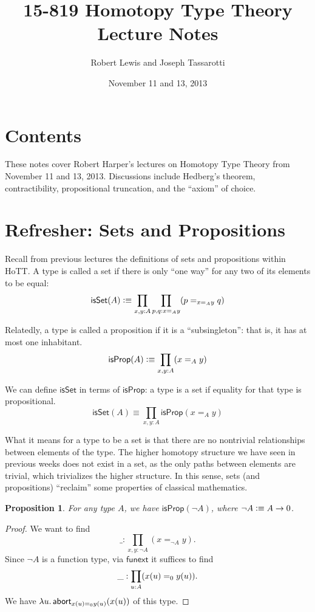 \documentclass[11pt]{article}
\title{15-819 Homotopy Type Theory\\Lecture Notes}
\author{Robert Lewis and Joseph Tassarotti}
\date{November 11 and 13, 2013}
\newcommand*{\funext}{\mathsf{funext}}
\newcommand*{\isSet}{\mathsf{isSet}}
\newcommand*{\isProp}{\mathsf{isProp}}
\newtheorem{proposition}{Proposition}
\begin{document}
\maketitle

\section{Contents}
These notes cover Robert Harper's lectures on Homotopy Type Theory from
November 11 and 13, 2013. Discussions include Hedberg's theorem, contractibility,
propositional truncation, and the ``axiom'' of choice.


\section{Refresher: Sets and Propositions}
Recall from previous lectures the definitions of sets and propositions within HoTT.
A type is called a set if there is only ``one way'' for any two of its elements to be equal:
$$ \isSet(A) \defeq \prod_{x,y:A}\prod_{p,q: x=_Ay}(p=_{x=_A y}q) $$

Relatedly, a type is called a proposition if it is a ``subsingleton'': that is, it has at most one inhabitant.
$$ \isProp(A) \defeq \prod_{x,y:A}(x=_A y) $$

We can define $\isSet$ in terms of $\isProp$: a type is a set if equality for that type is propositional.
$$ \isSet(A) \equiv \prod_{x,y:A}\isProp(x=_A y) $$

What it means for a type to be a set is that there are no nontrivial relationships between 
elements of the type. The higher homotopy structure we have seen in previous weeks does not exist
in a set, as the only paths between elements are trivial, which trivializes the higher structure.
In this sense, sets (and propositions) ``reclaim'' some properties of classical mathematics.

\begin{proposition}
 For any type $A$, we have $\isProp(\neg A)$, where $\neg A\vcentcolon\equiv A\to 0$.
\end{proposition}
\begin{proof}
 We want to find $$\_:\prod_{x,y:\neg A}(x=_{\neg A} y).$$ Since $\neg A$ is a function type, 
 via $\funext$ it suffices to find $$\_:\prod_{u: A}(x(u) =_0 y(u)).$$ 
 We have $\lambda u.\, \mathsf{abort}_{x(u)=_0 y(u)}(x(u))$ of this type.
\end{proof}
\end{document}
